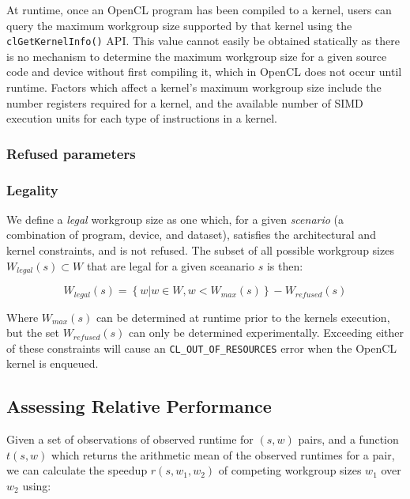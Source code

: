 At runtime, once an OpenCL program has been compiled to a kernel,
users can query the maximum workgroup size supported by that kernel
using the \texttt{clGetKernelInfo()} API. This value cannot easily be
obtained statically as there is no mechanism to determine the maximum
workgroup size for a given source code and device without first
compiling it, which in OpenCL does not occur until runtime. Factors
which affect a kernel's maximum workgroup size include the number
registers required for a kernel, and the available number of SIMD
execution units for each type of instructions in a kernel.


\subsubsection{Refused parameters}

\TODO{\ldots}


\subsubsection{Legality}

We define a \emph{legal} workgroup size as one which, for a given
\emph{scenario} (a combination of program, device, and dataset),
satisfies the architectural and kernel constraints, and is not
refused. The subset of all possible workgroup sizes
$W_{legal}(s) \subset W$ that are legal for a given sceanario $s$ is
then:

\begin{equation}
  W_{legal}(s) = \left\{w | w \in W, w < W_{max}(s) \right\} - W_{refused}(s)
\end{equation}

Where $W_{max}(s)$ can be determined at runtime prior to the kernels
execution, but the set $W_{refused}(s)$ can only be determined
experimentally. Exceeding either of these constraints will cause an
\texttt{CL\_OUT\_OF\_RESOURCES} error when the OpenCL kernel is
enqueued.


\subsection{Assessing Relative Performance}

Given a set of observations of observed runtime for $(s,w)$ pairs, and
a function $t(s,w)$ which returns the arithmetic mean of the observed
runtimes for a pair, we can calculate the speedup $r(s, w_1, w_2)$ of
competing workgroup sizes $w_1$ over $w_2$ using:

